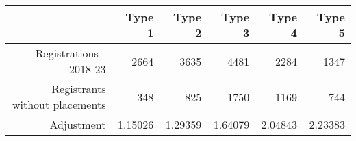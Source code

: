 \begin{tabular}{rrrrrr}
  \hline
   & \textbf{Type 1} & \textbf{Type 2} & \textbf{Type 3} & \textbf{Type 4} & \textbf{Type 5} \\\hline
  Registrations - 2018-23 & 2664 & 3635 & 4481 & 2284 & 1347 \\
  Registrants without placements & 348 & 825 & 1750 & 1169 & 744 \\
  Adjustment & 1.15026 & 1.29359 & 1.64079 & 2.04843 & 2.23383 \\\hline
\end{tabular}
